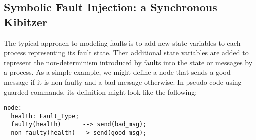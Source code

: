 \documentclass{llncs/llncs}
\begin{document}




\subsection{Symbolic Fault Injection: a Synchronous Kibitzer}\label{sec:kibitzer}
The typical approach to modeling faults is to add new state variables to each process representing its fault state. Then additional state variables are added to represent the non-determinism introduced by faults into the state or messages by a process. As a simple example, we might define a node that sends a good message if it is non-faulty and a bad message otherwise. In pseudo-code using guarded commands, its definition might look like the following:

\small
\begin{verbatim}
node:
  health: Fault_Type;
  faulty(health)      --> send(bad_msg);
  non_faulty(health) --> send(good_msg);
\end{verbatim}
\normalsize
\end{document}
